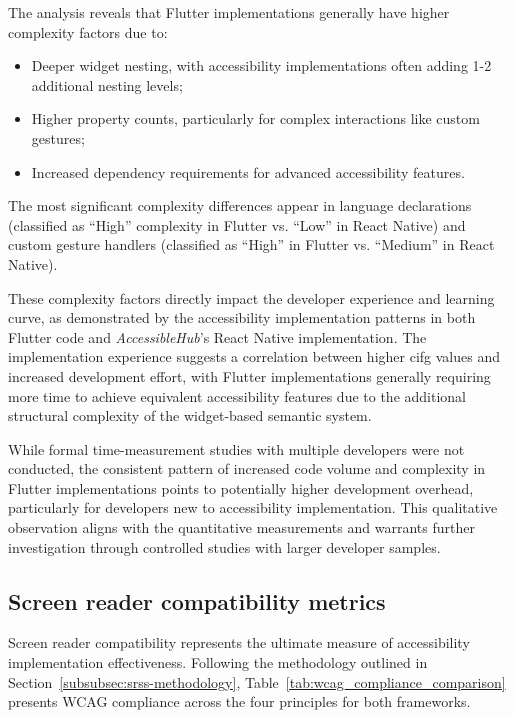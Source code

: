 The analysis reveals that Flutter implementations generally have higher complexity factors due to:

\begin{itemize}
    \item Deeper widget nesting, with accessibility implementations often adding 1-2 additional nesting levels;
    \item Higher property counts, particularly for complex interactions like custom gestures;
    \item Increased dependency requirements for advanced accessibility features.
\end{itemize}

The most significant complexity differences appear in language declarations (classified as ``High'' complexity in Flutter vs. ``Low'' in React Native) and custom gesture handlers (classified as ``High'' in Flutter vs. ``Medium'' in React Native).

These complexity factors directly impact the developer experience and learning curve, as demonstrated by the accessibility implementation patterns in both Flutter code and \textit{AccessibleHub}'s React Native implementation. The implementation experience suggests a correlation between higher \gls{cifg} values and increased development effort, with Flutter implementations generally requiring more time to achieve equivalent accessibility features due to the additional structural complexity of the widget-based semantic system.

While formal time-measurement studies with multiple developers were not conducted, the consistent pattern of increased code volume and complexity in Flutter implementations points to potentially higher development overhead, particularly for developers new to accessibility implementation. This qualitative observation aligns with the quantitative measurements and warrants further investigation through controlled studies with larger developer samples.

\subsection{Screen reader compatibility metrics}
\label{subsec:screen-reader-metrics}

Screen reader compatibility represents the ultimate measure of accessibility implementation effectiveness. Following the methodology outlined in Section~\ref{subsubsec:srss-methodology}, Table~\ref{tab:wcag_compliance_comparison} presents WCAG compliance across the four principles for both frameworks.

